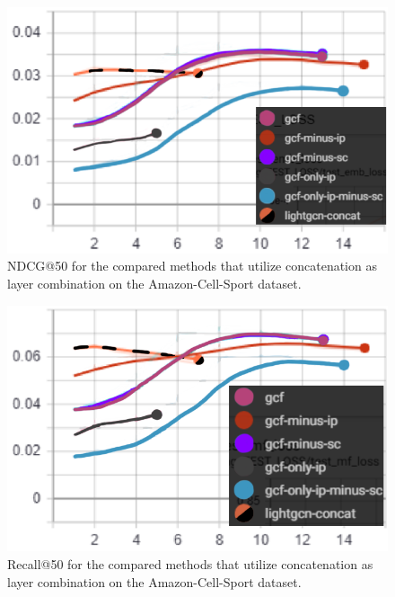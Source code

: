 \begin{figure}[]
    \includegraphics[width=\linewidth]{figures/amazon-cell-sport-gcf-ndcg.png}
    \caption{NDCG@50 for the compared methods that utilize concatenation as layer combination on the Amazon-Cell-Sport dataset.}
    \label{fig:GCF-NDCG-concat-ablation-study-Amazon-Cell-Sport}
\end{figure}
\begin{figure}[]
    \includegraphics[width=\linewidth]{figures/amazon-cell-sport-gcf-recall.png}
    \caption{Recall@50 for the compared methods that utilize concatenation as layer combination on the Amazon-Cell-Sport dataset.}
    \label{fig:GCF-recall-concat-ablation-study-Amazon-Cell-Sport}
\end{figure}
